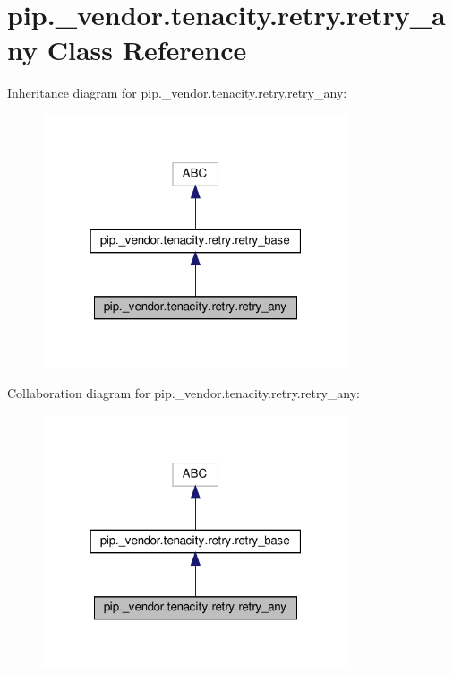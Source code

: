 \hypertarget{classpip_1_1__vendor_1_1tenacity_1_1retry_1_1retry__any}{}\section{pip.\+\_\+vendor.\+tenacity.\+retry.\+retry\+\_\+any Class Reference}
\label{classpip_1_1__vendor_1_1tenacity_1_1retry_1_1retry__any}


Inheritance diagram for pip.\+\_\+vendor.\+tenacity.\+retry.\+retry\+\_\+any\+:
\nopagebreak
\begin{figure}[H]
\begin{center}
\leavevmode
\includegraphics[width=256pt]{classpip_1_1__vendor_1_1tenacity_1_1retry_1_1retry__any__inherit__graph}
\end{center}
\end{figure}


Collaboration diagram for pip.\+\_\+vendor.\+tenacity.\+retry.\+retry\+\_\+any\+:
\nopagebreak
\begin{figure}[H]
\begin{center}
\leavevmode
\includegraphics[width=256pt]{classpip_1_1__vendor_1_1tenacity_1_1retry_1_1retry__any__coll__graph}
\end{center}
\end{figure}
